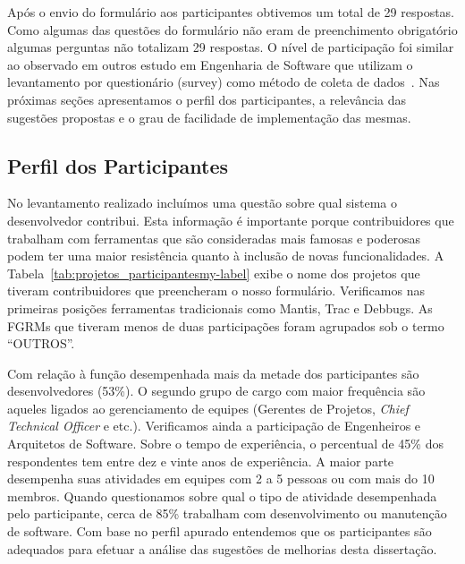 Após o envio do formulário aos participantes obtivemos um total de 29 respostas.
Como algumas das questões do formulário não eram de preenchimento obrigatório
algumas perguntas não totalizam 29 respostas. O nível de participação foi
similar ao observado em outros estudo em Engenharia de Software que utilizam o
levantamento por questionário (survey) como método de coleta de
dados~\cite{fan2010factors}. Nas próximas seções apresentamos o perfil dos
participantes, a relevância das sugestões propostas e o grau de facilidade de
implementação das mesmas.

\subsection{Perfil dos Participantes}
\label{sub:sug_melhorias_resultados_perfil_dos_participantes}

No levantamento realizado incluímos uma questão sobre qual sistema o
desenvolvedor contribui. Esta informação é importante porque contribuidores que
trabalham com ferramentas que são consideradas mais famosas e poderosas podem
ter uma maior resistência quanto à inclusão de novas funcionalidades. A
Tabela~\ref{tab:projetos_participantesmy-label} exibe o nome dos projetos que
tiveram contribuidores que preencheram o nosso formulário. Verificamos nas
primeiras posições ferramentas tradicionais como Mantis, Trac e Debbugs. As
FGRMs que tiveram menos de duas participações foram agrupados sob o termo
``OUTROS''.

\begin{table}[htpb]
\centering
{}
\caption{Projetos que os participantes contribuem.}
\label{tab:projetos_participantesmy-label}
\end{table}

Com relação à função desempenhada mais da metade dos participantes são
desenvolvedores (53\%). O segundo grupo de cargo com maior frequência são
aqueles ligados ao gerenciamento de equipes (Gerentes de Projetos,
\textit{Chief Technical Officer} e etc.). Verificamos ainda a participação de
Engenheiros e Arquitetos de Software. Sobre o tempo de experiência, o
percentual de 45\% dos respondentes tem entre dez e vinte anos de experiência.
A maior parte desempenha suas atividades em equipes com 2 a 5 pessoas ou com
mais do 10 membros. Quando questionamos sobre qual o tipo de atividade
desempenhada pelo participante, cerca de 85\% trabalham com desenvolvimento ou
manutenção de software. Com base no perfil apurado entendemos que os
participantes são adequados para efetuar a análise das sugestões de melhorias
desta dissertação.


